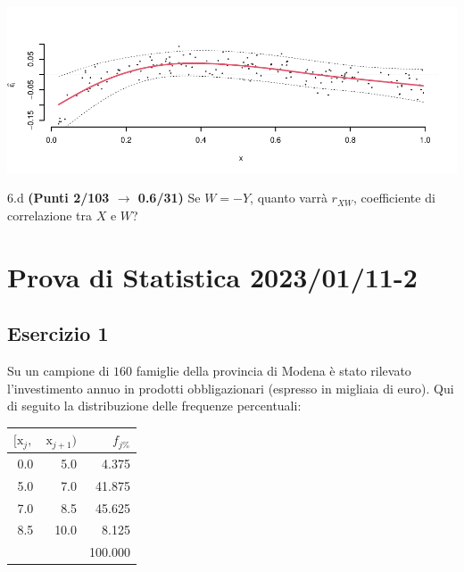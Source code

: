 \documentclass[
  11pt,
]{book}
\theoremstyle{mytheoremstyle}
\theoremstyle{mydefstyle}
\newenvironment{sol}
  {
  \begin{tcolorbox}[enhanced,breakable,arc=0.1mm,boxrule=1pt,colback=white,colframe=iblue,
  title=\bf \fontfamily{lmss}\selectfont \hspace{.5 cm} Soluzione,drop fuzzy shadow]

}{
\end{tcolorbox}
  }
\begin{document}
\begin{sol}

\begin{center}\includegraphics{Esami_passati_con_soluzioni_files/figure-latex/2023-5,-1} \end{center}

\end{sol}

6.d \textbf{(Punti 2/103 \(\rightarrow\) 0.6/31)} Se \(W=- Y\), quanto varrà \(r_{XW}\), coefficiente di correlazione tra \(X\) e \(W\)?

\section{Prova di Statistica 2023/01/11-2}\label{prova-di-statistica-20230111-2}

\subsection{Esercizio 1}\label{esercizio-1-21}

Su un campione di \(160\) famiglie della provincia di Modena è stato rilevato l'investimento annuo in prodotti obbligazionari (espresso in migliaia di euro). Qui di seguito la distribuzione delle frequenze percentuali:

\begin{sol}

\begin{table}[H]
\centering
\begin{tabular}{rrr}
\toprule
$[\text{x}_j,$ & $\text{x}_{j+1})$ & $f_{j\%}$\\
\midrule
0.0 & 5.0 & 4.375\\
5.0 & 7.0 & 41.875\\
7.0 & 8.5 & 45.625\\
8.5 & 10.0 & 8.125\\
 &  & 100.000\\
\bottomrule
\end{tabular}
\end{table}

\end{sol}
\end{document}
